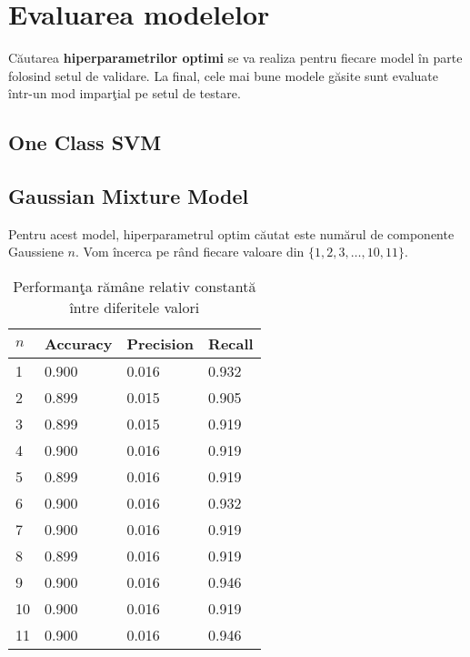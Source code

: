 \chapter{Evaluarea modelelor}

Căutarea \textbf{hiperparametrilor optimi} se va realiza pentru fiecare model 
în parte folosind setul de validare. La final, cele mai bune modele 
găsite sunt evaluate într-un mod imparţial pe setul de testare. 

\section{One Class SVM}

\section{Gaussian Mixture Model}

Pentru acest model, hiperparametrul optim 
căutat este numărul de componente Gaussiene $n$. Vom încerca pe rând fiecare valoare
din $\{1, 2, 3, \ldots, 10, 11\}$.

\begin{table}[htb]
    \centering
    \begin{tabularx}{\textwidth}{
        |X
        |X
        |X
        |X|
    }
    \hline
    $n$ & {Accuracy} & {Precision} & {Recall} \\
    \hline
    \rowcolor{gray!20} 1 & 0.900 & 0.016 & 0.932 \\
    2 & 0.899 & 0.015 & 0.905 \\
    \rowcolor{gray!20} 3 & 0.899 & 0.015 & 0.919 \\
    4 & 0.900 & 0.016 & 0.919 \\
    \rowcolor{gray!20} 5 & 0.899 & 0.016 & 0.919 \\
    6 & 0.900 & 0.016 & 0.932 \\
    \rowcolor{gray!20} 7 & 0.900 & 0.016 & 0.919 \\
    8 & 0.899 & 0.016 & 0.919 \\
    \rowcolor{gray!20} 9 & 0.900 & 0.016 & 0.946 \\
    10 & 0.900 & 0.016 & 0.919 \\
    \rowcolor{gray!20} 11 & 0.900 & 0.016 & 0.946 \\
    \hline
    \end{tabularx}
    \caption{Performanţa rămâne relativ constantă între diferitele valori}
\end{table}


